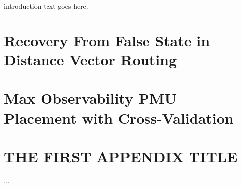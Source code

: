 \documentclass{umthesis}          %
\begin{document}

introduction text goes here.


\chapter{Recovery From False State in Distance Vector Routing} 







%















\chapter{Max Observability PMU Placement with Cross-Validation} 








 











\appendix
\chapter{THE FIRST APPENDIX TITLE}
...

\backmatter  %




\end{document}
